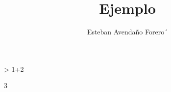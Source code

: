 \documentclass{article}
\title{Ejemplo}
\author{Esteban Avendaño Forero´}
\begin{document}

\maketitle

\begin{Schunk}
\begin{Sinput}
> 1+2
\end{Sinput}
\begin{Soutput}
[1] 3
\end{Soutput}
\end{Schunk}
\end{document}
